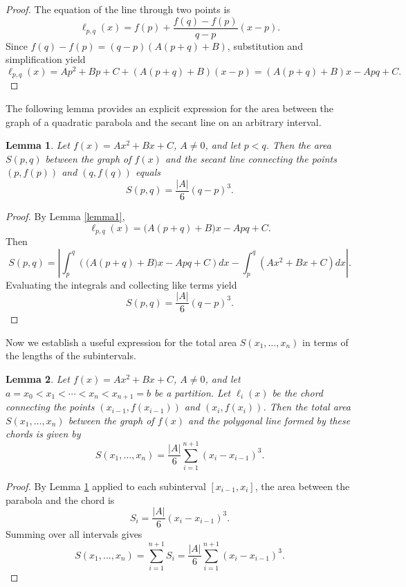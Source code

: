 \documentclass[amstex,16pt, amssymb]{article}
\theoremstyle{plain}
\newtheorem{lemma}{Lemma}[section]
\theoremstyle{definition}
\numberwithin{equation}{section}
\numberwithin{equation}{section}
\begin{document}
\begin{proof}
The equation of the line through two points is
\[
\ell_{p,q}(x) = f(p) + \frac{f(q)-f(p)}{q-p}(x-p).
\]
Since $f(q)-f(p) = (q-p)(A(p+q)+B)$, substitution and simplification yield
\[
\ell_{p,q}(x) = Ap^2 + Bp + C + (A(p+q)+B)(x-p) = (A(p+q)+B)x - A pq + C.
\]
\end{proof}

The following lemma provides an explicit expression for the area between the graph of a quadratic parabola and the secant line on an arbitrary interval.

\begin{lemma}\label{lemma2}
Let $f(x) = Ax^2 + Bx + C$, $A \neq  0$, and let $p < q$. Then the area $S(p, q)$ between the graph of $f(x)$ and the secant line connecting the points $(p, f(p))$ and $(q, f(q))$ equals
\[
S(p, q) = \frac{|A|}{6}(q - p)^3.
\]
\end{lemma}

\begin{proof}
By Lemma \ref{lemma1},
\[
\ell_{p,q}(x) = \bigl(A(p+q) + B\bigr)x - A pq + C.
\]
Then
\[
S(p, q) = \left|\int_p^q \left( \bigl(A(p+q) + B\bigr)x - A pq + C \right) dx - \int_p^q \left( Ax^2 + Bx + C \right) dx\right|.
\]
Evaluating the integrals and collecting like terms yield
\[
S(p, q) = \frac{|A|}{6}(q - p)^3.
\]
\end{proof}

Now we establish a useful expression for the total area $S(x_1, \ldots, x_n)$ in terms of the lengths of the subintervals.


\begin{lemma}\label{lemma3}
Let $f(x) = Ax^2 + Bx + C$, $A \neq 0$, and let $a =x_0 < x_1 < \cdots < x_n < x_{n+1} = b$ be a partition. Let $\ell_i(x)$ be the chord connecting the points $(x_{i-1}, f(x_{i-1}))$ and $(x_i, f(x_i))$. Then the total area $S(x_1, \ldots, x_n)$ between the graph of $f(x)$ and the polygonal line formed by these chords is given by
\[
S(x_1, \ldots, x_n) = \frac{|A|}{6} \sum_{i=1}^{n+1} (x_i - x_{i-1})^3.
\]
\end{lemma}

\begin{proof}
By Lemma \ref{lemma2} applied to each subinterval $[x_{i-1}, x_i]$, the area between the parabola and the chord is
\[
S_i = \frac{|A|}{6} (x_i - x_{i-1})^3.
\]
Summing over all intervals gives
\[
S(x_1, \ldots, x_n) = \sum_{i=1}^{n+1} S_i = \frac{|A|}{6} \sum_{i=1}^{n+1} (x_i - x_{i-1})^3.
\]
\end{proof}
\end{document}
